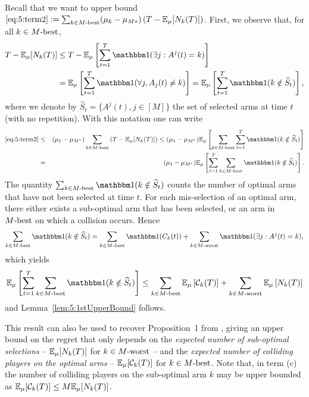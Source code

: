 \begin{smallproof}
  Recall that we want to upper bound
  $ \ref{eq:5:term2} : = \sum_{k \in M\text{-}\mathrm{best}} (\mu_k - \mu_{M*}) \left(T - \mathbb{E}_{\mu}[N_k(T)]\right)$.
  First, we observe that, for all $k\in M\text{-}\mathrm{best}$,
  \begin{eqnarray*}
    T - \E_{\mu}[N_k(T)] & \leq T - \E_{\mu}\left[\sum_{t=1}^T \indic(\exists j : A^j(t) = k)\right] \\
    & = \E_{\mu}\left[\sum_{t=1}^T \indic(\forall j, A_j(t) \neq k)\right] = \E_{\mu}\left[\sum_{t=1}^T \indic(k \notin \widehat{S}_t)\right],
  \end{eqnarray*}
  where we denote by $\widehat{S}_t = \{A^j(t), j \in [M]\}$ the set of selected arms at time $t$ (with no repetition). With this notation one can write
  \begin{eqnarray*}
  \ref{eq:5:term2} & \leq & (\mu_1 - \mu_{M^*})  \sum_{k \in \Mbest} \left(T - \E_{\mu}[N_k(T)]\right) \leq  (\mu_1 - \mu_{M^*})  \E_{\mu}\left[\sum_{k \in \Mbest} \sum_{t = 1}^T \indic(k \notin \widehat{S}_t)\right] \\
  & = &  (\mu_1 - \mu_{M^*})  \E_{\mu}\left[ \sum_{t = 1}^T \sum_{k \in \Mbest}\indic(k \notin \widehat{S}_t)\right].
  \end{eqnarray*}
  The quantity $\sum_{k \in \Mbest}\indic(k \notin \widehat{S}_t)$ counts the number of optimal arms that have not been selected at time $t$. For each mis-selection of an optimal arm, there either exists a sub-optimal arm that has been selected, or an arm in $M\text{-}\mathrm{best}$ on which a collision occurs. Hence
  \[\sum_{k \in \Mbest}\indic(k \notin \widehat{S}_t) = \sum_{k \in \Mbest}\indic(C_k(t)) + \sum_{k \in \Mworst} \indic(\exists j : A^j(t) = k),\]
  which yields
  \[\E_{\mu}\left[ \sum_{t = 1}^T \sum_{k \in \Mbest}\indic(k \notin \widehat{S}_t)\right] \leq \sum_{k \in \Mbest}\E_{\mu}\left[\cC_k(T)\right] + \sum_{k \in \Mworst} \E_{\mu}\left[N_k(T)\right]\]
  and Lemma~\ref{lem:5:1stUpperBound} follows.
\end{smallproof}


This result can also be used to recover Proposition~1 from \cite{Anandkumar11}, giving an upper bound on the regret that only depends on
the \emph{expected number of sub-optimal selections} -- $\mathbb{E}_{\mu}[N_k(T)]$ for $k \in M\text{-}\mathrm{worst}$ --
and the \emph{expected number of colliding players on the optimal arms} -- $\mathbb{E}_{\mu}[\mathcal{C}_k(T)]$ for $k \in M\text{-}\mathrm{best}$. Note that, in term (c) the number of colliding players on the sub-optimal arm $k$ may be upper bounded as $\mathbb{E}_{\mu}[\mathcal{C}_k(T)] \leq M \mathbb{E}_{\mu}[N_k(T)]$.
%


